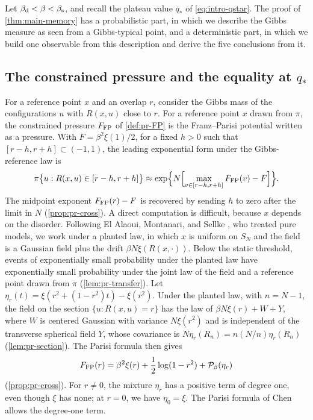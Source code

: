 Let $\beta_{\mathrm d}<\beta<\beta_{\mathrm s}$, and recall the plateau value $q_*$ of \eqref{eq:intro-qstar}. The proof of \cref{thm:main-memory} has a probabilistic part, in which we describe the Gibbs measure as seen from a Gibbs-typical point, and a deterministic part, in which we build one observable from this description and derive the five conclusions from it.

\subsection{The constrained pressure and the equality at \texorpdfstring{$q_*$}{q*}}\label{sec:ov-pressure}

For a reference point $x$ and an overlap $r$, consider the Gibbs mass of the configurations $u$ with $R(x,u)$ close to $r$. For a reference point $x$ drawn from $\pi$, the constrained pressure $F_{\rm FP}$ of \cref{def:pr-FP} is the Franz--Parisi potential written as a pressure. With $F=\beta^2\xi(1)/2$, for a fixed $h>0$ such that $[r-h,r+h]\subset(-1,1)$, the leading exponential form under the Gibbs-reference law is
\begin{equation}\label{eq:ov-FP}
\pi\bigl\{u:R(x,u)\in[r-h,r+h]\bigr\}\approx\exp\Bigl\{N\Bigl[\max_{v\in[r-h,r+h]}F_{\rm FP}(v)-F\Bigr]\Bigr\}.
\end{equation}
The midpoint exponent $F_{\rm FP}(r)-F$ is recovered by sending $h$ to zero after the limit in $N$ (\cref{prop:pr-cross}).
A direct computation is difficult, because $x$ depends on the disorder. Following El Alaoui, Montanari, and Sellke \cite{ElAlaouiMontanariSellke2025}, who treated pure models, we work under a planted law, in which $x$ is uniform on $S_N$ and the field is a Gaussian field plus the drift $\beta N\xi(R(x,\cdot))$. Below the static threshold, events of exponentially small probability under the planted law have exponentially small probability under the joint law of the field and a reference point drawn from $\pi$ (\cref{lem:pr-transfer}). Let $\eta_r(t)=\xi(r^2+(1-r^2)t)-\xi(r^2)$. Under the planted law, with $n=N-1$, the field on the section $\{u:R(x,u)=r\}$ has the law of $\beta N\xi(r)+W+Y$, where $W$ is centered Gaussian with variance $N\xi(r^2)$ and is independent of the transverse spherical field $Y$, whose covariance is $N\eta_r(R_n)=n(N/n)\eta_r(R_n)$ (\cref{lem:pr-section}). The Parisi formula then gives
\begin{equation}\label{eq:ov-cross}
F_{\rm FP}(r)=\beta^2\xi(r)+\frac12\log(1-r^2)+\mathcal P_\beta(\eta_r)
\end{equation}
(\cref{prop:pr-cross}). For $r\ne0$, the mixture $\eta_r$ has a positive term of degree one, even though $\xi$ has none; at $r=0$, we have $\eta_0=\xi$. The Parisi formula of Chen \cite{Chen2013} allows the degree-one term.

